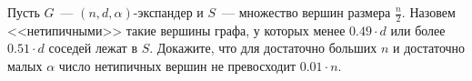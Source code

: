 Пусть $G$~--- $(n, d, \alpha)$-экспандер и $S$~--- множество вершин размера $\frac{n}{2}$. Назовем
<<нетипичными>> такие вершины графа, у которых менее $0.49 \cdot d$ или более $0.51 \cdot d$ соседей
лежат в $S$. Докажите, что для достаточно больших $n$ и достаточно малых $\alpha$ число нетипичных вершин
не превосходит $0.01 \cdot n$.
